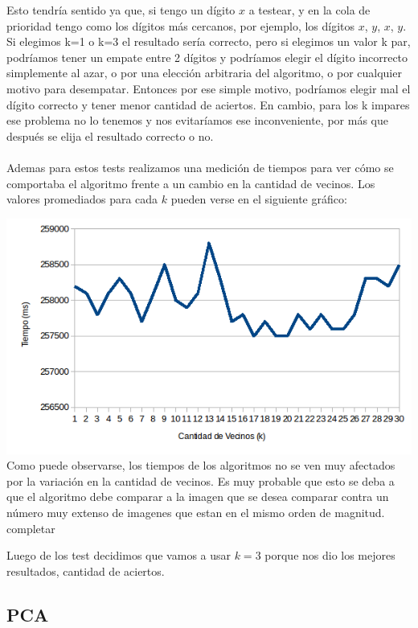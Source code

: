 Esto tendría sentido ya que, si tengo un dígito $x$ a testear, y en la cola de prioridad tengo como los dígitos más cercanos, por ejemplo, los dígitos $x$, $y$, $x$, $y$.
Si elegimos k=1 o k=3 el resultado sería correcto, pero si elegimos un valor k par, podríamos tener un empate entre 2 dígitos y podríamos elegir el dígito incorrecto simplemente al azar, o por una elección arbitraria del algoritmo, o por cualquier motivo para desempatar. Entonces por ese simple motivo, podríamos elegir mal el dígito correcto y tener menor cantidad de aciertos. En cambio, para los k impares ese problema no lo tenemos y nos evitaríamos ese inconveniente, por más que después se elija el resultado correcto o no. \\ \\

Ademas para estos tests realizamos una medición de tiempos para ver cómo se comportaba el algoritmo frente a un cambio en la cantidad de vecinos. Los valores promediados para cada $k$ pueden verse en el siguiente gráfico:

\includegraphics[scale=0.55]{nuevosResultados/knn/knntemp.png}\\

Como puede observarse, los tiempos de los algoritmos no se ven muy afectados por la variación en la cantidad de vecinos. Es muy probable que esto se deba a que el algoritmo debe comparar a la imagen que se desea comparar contra un número muy extenso de imagenes que estan en el mismo orden de magnitud. 
completar

Luego de los test decidimos que vamos a usar $k=3$ porque nos dio los mejores resultados, cantidad de aciertos.

\subsection{PCA}
